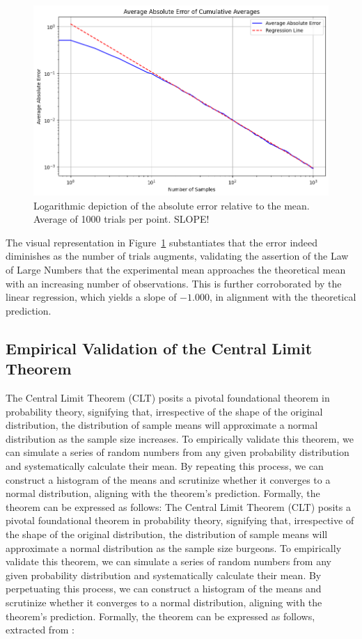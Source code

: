 \documentclass{article}
\begin{document}
\begin{figure}[H]
	\centering
	\includegraphics[width=0.5\linewidth]{./Figures/LLN/verifloglog.png}
	\caption{Logarithmic depiction of the absolute error relative to the mean. Average of 1000 trials per point. SLOPE!}
	\label{fig:verificationllnlog}
\end{figure}

The visual representation in Figure~\ref{fig:verificationllnlog} substantiates that the error indeed diminishes as the number of trials augments, validating the assertion of the Law of Large Numbers that the experimental mean approaches the theoretical mean with an increasing number of observations. This is further corroborated by the linear regression, which yields a slope of \(-1.000\), in alignment with the theoretical prediction.

\subsection{Empirical Validation of the Central Limit Theorem}
\label{sec:clt}

The Central Limit Theorem (CLT) posits a pivotal foundational theorem in probability theory, signifying that, irrespective of the shape of the original distribution, the distribution of sample means will approximate a normal distribution as the sample size increases. To empirically validate this theorem, we can simulate a series of random numbers from any given probability distribution and systematically calculate their mean. By repeating this process, we can construct a histogram of the means and scrutinize whether it converges to a normal distribution, aligning with the theorem's prediction. Formally, the theorem can be expressed as follows:
The Central Limit Theorem (CLT) posits a pivotal foundational theorem in probability theory, signifying that, irrespective of the shape of the original distribution, the distribution of sample means will approximate a normal distribution as the sample size burgeons. To empirically validate this theorem, we can simulate a series of random numbers from any given probability distribution and systematically calculate their mean. By perpetuating this process, we can construct a histogram of the means and scrutinize whether it converges to a normal distribution, aligning with the theorem's prediction. Formally, the theorem can be expressed as follows, extracted from \cite{jourdain2016probabilites}:
\end{document}
